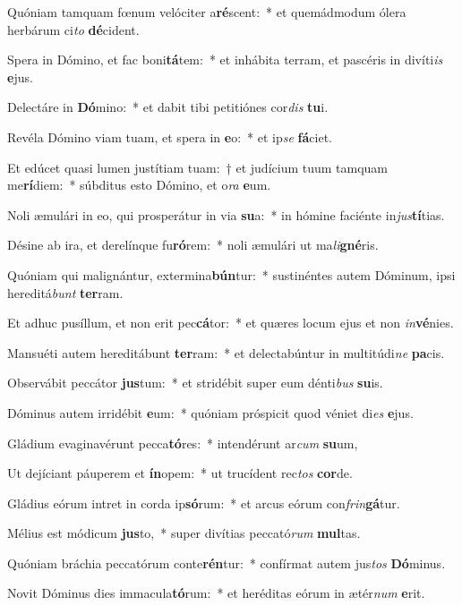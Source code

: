\item Quóniam tamquam fœnum velóciter a\textbf{ré}scent:~* et quemádmodum ólera herbárum ci\textit{to} \textbf{dé}cident.
\item Spera in Dómino, et fac boni\textbf{tá}tem:~* et inhábita terram, et pascéris in divíti\textit{is} \textbf{e}jus.
\item Delectáre in \textbf{Dó}mino:~* et dabit tibi petitiónes cor\textit{dis} \textbf{tu}i.
\item Revéla Dómino viam tuam, et spera in \textbf{e}o:~* et ip\textit{se} \textbf{fá}ciet.
\item Et edúcet quasi lumen justítiam tuam:~† et judícium tuum tamquam me\textbf{rí}diem:~* súbditus esto Dómino, et o\textit{ra} \textbf{e}um.
\item Noli æmulári in eo, qui prosperátur in via \textbf{su}a:~* in hómine faciénte in\textit{jus}\textbf{tí}tias.
\item Désine ab ira, et derelínque fu\textbf{ró}rem:~* noli æmulári ut ma\textit{li}\textbf{gné}ris.
\item Quóniam qui malignántur, extermina\textbf{bún}tur:~* sustinéntes autem Dóminum, ipsi hereditá\textit{bunt} \textbf{ter}ram.
\item Et adhuc pusíllum, et non erit pec\textbf{cá}tor:~* et quæres locum ejus et non \textit{in}\textbf{vé}nies.
\item Mansuéti autem hereditábunt \textbf{ter}ram:~* et delectabúntur in multitúdi\textit{ne} \textbf{pa}cis.
\item Observábit peccátor \textbf{jus}tum:~* et stridébit super eum dénti\textit{bus} \textbf{su}is.
\item Dóminus autem irridébit \textbf{e}um:~* quóniam próspicit quod véniet di\textit{es} \textbf{e}jus.
\item Gládium evaginavérunt pecca\textbf{tó}res:~* intendérunt ar\textit{cum} \textbf{su}um,
\item Ut dejíciant páuperem et \textbf{ín}opem:~* ut trucídent rec\textit{tos} \textbf{cor}de.
\item Gládius eórum intret in corda ip\textbf{só}rum:~* et arcus eórum con\textit{frin}\textbf{gá}tur.
\item Mélius est módicum \textbf{jus}to,~* super divítias peccató\textit{rum} \textbf{mul}tas.
\item Quóniam bráchia peccatórum conte\textbf{rén}tur:~* confírmat autem jus\textit{tos} \textbf{Dó}minus.
\item Novit Dóminus dies immacula\textbf{tó}rum:~* et heréditas eórum in ætér\textit{num} \textbf{e}rit.

